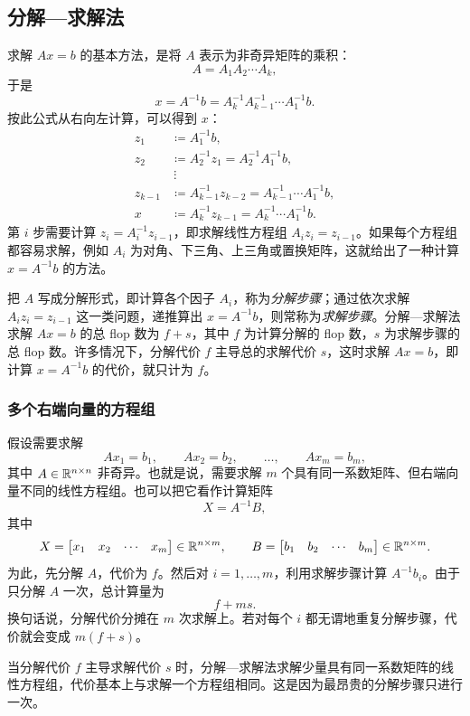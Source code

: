 \subsection{分解—求解法}
求解 $Ax=b$ 的基本方法，是将 $A$ 表示为非奇异矩阵的乘积：
\[
 A=A_1A_2\cdots A_k,
\]
于是
\[
 x=A^{-1}b=A_k^{-1}A_{k-1}^{-1}\cdots A_1^{-1}b.
\]
按此公式从右向左计算，可以得到 $x$：
\begin{align*}
 z_1&\coloneqq A_1^{-1}b,\\
 z_2&\coloneqq A_2^{-1}z_1=A_2^{-1}A_1^{-1}b,\\
 &\ \vdots\\
 z_{k-1}&\coloneqq A_{k-1}^{-1}z_{k-2}=A_{k-1}^{-1}\cdots A_1^{-1}b,\\
 x&\coloneqq A_k^{-1}z_{k-1}=A_k^{-1}\cdots A_1^{-1}b.
\end{align*}
第 $i$ 步需要计算 $z_i=A_i^{-1}z_{i-1}$，即求解线性方程组 $A_iz_i=z_{i-1}$。如果每个方程组都容易求解，例如 $A_i$ 为对角、下三角、上三角或置换矩阵，这就给出了一种计算 $x=A^{-1}b$ 的方法。

把 $A$ 写成分解形式，即计算各个因子 $A_i$，称为\emph{分解步骤}；通过依次求解 $A_iz_i=z_{i-1}$ 这一类问题，递推算出 $x=A^{-1}b$，则常称为\emph{求解步骤}。分解—求解法求解 $Ax=b$ 的总 flop 数为 $f+s$，其中 $f$ 为计算分解的 flop 数，$s$ 为求解步骤的总 flop 数。许多情况下，分解代价 $f$ 主导总的求解代价 $s$，这时求解 $Ax=b$，即计算 $x=A^{-1}b$ 的代价，就只计为 $f$。

\subsubsection*{多个右端向量的方程组}
假设需要求解
\[
 Ax_1=b_1,\qquad Ax_2=b_2,\qquad\ldots,\qquad Ax_m=b_m,
\]
其中 $A\in\mathbb R^{n\times n}$ 非奇异。也就是说，需要求解 $m$ 个具有同一系数矩阵、但右端向量不同的线性方程组。也可以把它看作计算矩阵
\[
 X=A^{-1}B,
\]
其中
\[
 X=\begin{bmatrix}x_1&x_2&\cdots&x_m\end{bmatrix}\in\mathbb R^{n\times m},\qquad
 B=\begin{bmatrix}b_1&b_2&\cdots&b_m\end{bmatrix}\in\mathbb R^{n\times m}.
\]
为此，先分解 $A$，代价为 $f$。然后对 $i=1,\ldots,m$，利用求解步骤计算 $A^{-1}b_i$。由于只分解 $A$ 一次，总计算量为
\[
 f+ms.
\]
换句话说，分解代价分摊在 $m$ 次求解上。若对每个 $i$ 都无谓地重复分解步骤，代价就会变成 $m(f+s)$。

当分解代价 $f$ 主导求解代价 $s$ 时，分解—求解法求解少量具有同一系数矩阵的线性方程组，代价基本上与求解一个方程组相同。这是因为最昂贵的分解步骤只进行一次。
